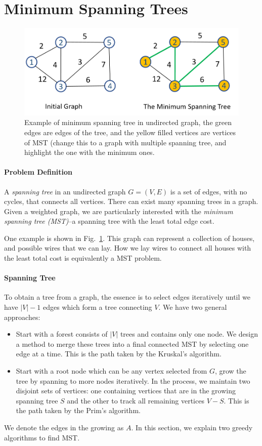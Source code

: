\documentclass[../main.tex]{subfiles}
\begin{document}
\section{Minimum Spanning Trees}
  \begin{figure}[!ht]
     \centering
     \includegraphics[width=0.99\columnwidth]{fig/mst_example.png}
     \caption{Example of minimum spanning tree in undirected graph, the green edges are edges of the tree, and the yellow filled vertices are vertices of MST (change this to a graph with multiple spanning tree, and highlight the one with the minimum ones.}
     \label{fig:prim_example}
 \end{figure}
\paragraph{Problem Definition} A \textit{spanning tree} in an undirected
graph $G=(V, E)$ is a set of edges, with
no cycles, that connects all vertices. There can exist many spanning trees in a graph. Given a weighted graph, we are particularly interested with  the \textit{minimum spanning tree (MST)}--a spanning tree with the least total edge cost.  

One example is shown in Fig.~\ref{fig:prim_example}.  This graph can represent a collection of houses, and possible wires that we can lay. How we lay wires
to connect all houses with the least total cost is equivalently a MST problem.

\paragraph{Spanning Tree}
To obtain a tree from a graph, the essence is to select edges iteratively until we have $|V|-1$ edges which form a tree connecting $V$. We have two general approaches:
\begin{itemize}
    \item Start with a forest consists of $|V|$ trees and contains only one node. We design a method to merge these trees into a final connected MST by selecting one edge at a time. This is the path taken by the Kruskal's algorithm.
    \item Start with a root node which can be any vertex selected from $G$, grow the tree by spanning to more nodes iteratively. In the process, we maintain two disjoint sets of vertices: one containing vertices that are in the growing spanning tree $S$ and the other to track all remaining vertices $V-S$.  This is the path taken by the Prim's algorithm.
\end{itemize}
We denote the edges in the growing as $A$. In this section, we explain two greedy algorithms to find MST.
\end{document}
